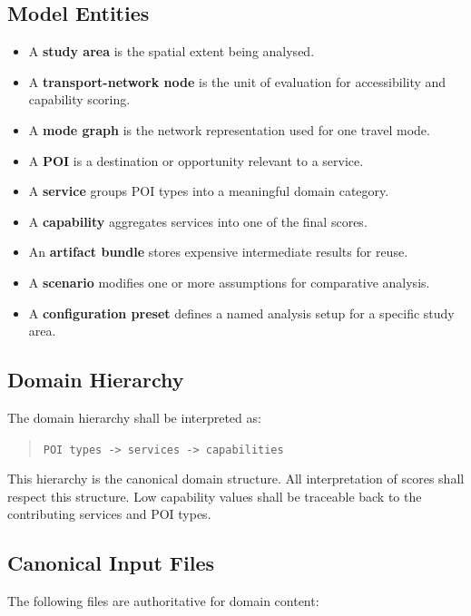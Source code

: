 \documentclass[11pt]{article}
\begin{document}
\subsection*{Model Entities}

\begin{itemize}
  \item A \textbf{study area} is the spatial extent being analysed.
  \item A \textbf{transport-network node} is the unit of evaluation for accessibility and capability scoring.
  \item A \textbf{mode graph} is the network representation used for one travel mode.
  \item A \textbf{POI} is a destination or opportunity relevant to a service.
  \item A \textbf{service} groups POI types into a meaningful domain category.
  \item A \textbf{capability} aggregates services into one of the final scores.
  \item An \textbf{artifact bundle} stores expensive intermediate results for reuse.
  \item A \textbf{scenario} modifies one or more assumptions for comparative analysis.
  \item A \textbf{configuration preset} defines a named analysis setup for a specific study area.
\end{itemize}

\subsection*{Domain Hierarchy}

The domain hierarchy shall be interpreted as:

\begin{quote}
\texttt{POI types -> services -> capabilities}
\end{quote}

This hierarchy is the canonical domain structure. All interpretation of scores shall respect this structure. Low capability values shall be traceable back to the contributing services and POI types.

\subsection*{Canonical Input Files}

The following files are authoritative for domain content:
\end{document}
